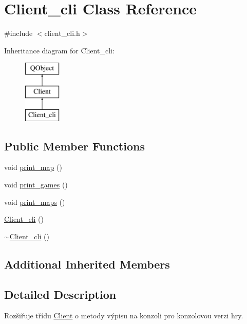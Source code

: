 \hypertarget{classClient__cli}{\section{Client\-\_\-cli Class Reference}
\label{classClient__cli}
}


{\ttfamily \#include $<$client\-\_\-cli.\-h$>$}

Inheritance diagram for Client\-\_\-cli\-:\begin{figure}[H]
\begin{center}
\leavevmode
\includegraphics[height=3.000000cm]{classClient__cli}
\end{center}
\end{figure}
\subsection*{Public Member Functions}
\begin{DoxyCompactItemize}
\item 
void \hyperlink{classClient__cli_aab3857cbd9c35a5b75ad01983c43ef9d}{print\-\_\-map} ()
\item 
void \hyperlink{classClient__cli_acb41c82bae07ce96591a189cbd5d6482}{print\-\_\-games} ()
\item 
void \hyperlink{classClient__cli_a3013ba30eb58163516088a649abc878f}{print\-\_\-maps} ()
\item 
\hyperlink{classClient__cli_a60327af92733d8c08caf4461cc183700}{Client\-\_\-cli} ()
\item 
\hyperlink{classClient__cli_a8c6fc3daf73356dffc52a9429c093b64}{$\sim$\-Client\-\_\-cli} ()
\end{DoxyCompactItemize}
\subsection*{Additional Inherited Members}


\subsection{Detailed Description}
Rozšiřuje třídu \hyperlink{classClient}{Client} o metody výpisu na konzoli pro konzolovou verzi hry. 

